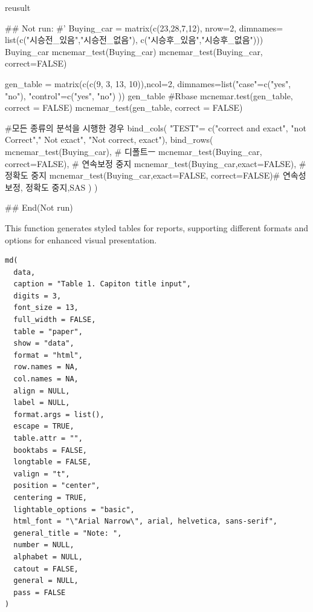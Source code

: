 \documentclass[a4paper]{book}
\begin{document}
%
\begin{Value}
reusult
\end{Value}
%
\begin{Examples}
\begin{ExampleCode}

\#\# Not run: 
#'
Buying_car  = matrix(c(23,28,7,12), nrow=2,
                     dimnames= list(c("시승전_있음","시승전_없음"),
                                    c("시승후_있음","시승후_없음")))
Buying_car
mcnemar_test(Buying_car)
mcnemar_test(Buying_car, correct=FALSE)

gen_table = matrix(c(c(9, 3, 13, 10)),ncol=2,
                   dimnames=list("case"=c("yes", "no"),
                                 "control"=c("yes", "no")   ))
gen_table
#Rbase
mcnemar.test(gen_table, correct = FALSE)
mcnemar_test(gen_table, correct = FALSE)



#모든 종류의 분석을 시행한 경우
bind_cols(
  "TEST"= c("correct and exact", "not Correct"," Not exact", "Not correct, exact"),
  bind_rows(
    mcnemar_test(Buying_car),  # 디폴트ㅡ
    mcnemar_test(Buying_car, correct=FALSE), # 연속보정 중지
    mcnemar_test(Buying_car,exact=FALSE), # 정확도 중지
    mcnemar_test(Buying_car,exact=FALSE, correct=FALSE)# 연속성 보정, 정확도 중지,SAS
  )
)%

## End(Not run)
\end{ExampleCode}
\end{Examples}
%
\begin{Description}
This function generates styled tables for reports, supporting different formats and options for enhanced visual presentation.
\end{Description}
%
\begin{Usage}
\begin{verbatim}
md(
  data,
  caption = "Table 1. Capiton title input",
  digits = 3,
  font_size = 13,
  full_width = FALSE,
  table = "paper",
  show = "data",
  format = "html",
  row.names = NA,
  col.names = NA,
  align = NULL,
  label = NULL,
  format.args = list(),
  escape = TRUE,
  table.attr = "",
  booktabs = FALSE,
  longtable = FALSE,
  valign = "t",
  position = "center",
  centering = TRUE,
  lightable_options = "basic",
  html_font = "\"Arial Narrow\", arial, helvetica, sans-serif",
  general_title = "Note: ",
  number = NULL,
  alphabet = NULL,
  catout = FALSE,
  general = NULL,
  pass = FALSE
)
\end{verbatim}
\end{Usage}
\end{document}

